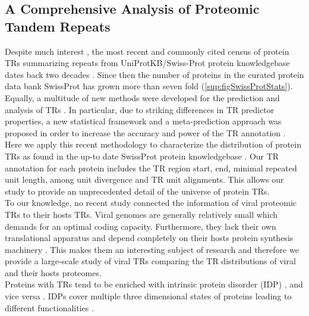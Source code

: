 \documentclass[a4,center,fleqn]{NAR}
\begin{document}
\subsection{A Comprehensive Analysis of Proteomic Tandem Repeats}
Despite much interest \cite{DiDomenico2013}, the most recent and commonly cited census of protein TRs summarizing repeats from UniProtKB/Swiss-Prot protein knowledgebase \cite{UniProt2017} dates back two decades \cite{Marcotte1999}. Since then the number of proteins in the curated protein data bank SwissProt has grown more than seven fold (\ref{sup:figSwissProtStats}).
Equally, a multitude of new methods were developed for the prediction and analysis of TRs \cite{Anisimova2015, Fertin2015, Dashnow2018}. In particular, due to striking differences in TR predictor properties, a new statistical framework and a meta-prediction approach was proposed in order to increase the accuracy and power of the TR annotation \cite{Anisimova2015, Schaper2015}.\\
Here we apply this recent methodology to characterize the distribution of protein TRs as found in the up-to date SwissProt protein knowledgebase \cite{Boutet2016, UniProt2017}. Our TR annotation for each protein includes the TR region start, end, minimal repeated unit length, among unit divergence and TR unit alignments. This allows our study to provide an unprecedented detail of the universe of protein TRs.\\
To our knowledge, no recent study connected the information of viral proteomic TRs to their hosts TRs. 
Viral genomes are generally relatively small which demands for an optimal coding capacity. 
Furthermore, they lack their own translational apparatus and depend completely on their hosts protein synthesis machinery \cite{Walsh2003, Stern2018}. This makes them an interesting subject of research and therefore we provide a large-scale study of viral TRs comparing the TR distributions of viral and their hosts proteomes.\\
Proteins with TRs tend to be enriched with intrinsic protein disorder (IDP) \cite{Jorda2010}, and vice versa \cite{Szalkowski2013}.
IDPs cover multiple three dimensional states of proteins leading to different functionalities \cite{Dunker2001}. 
\end{document}
